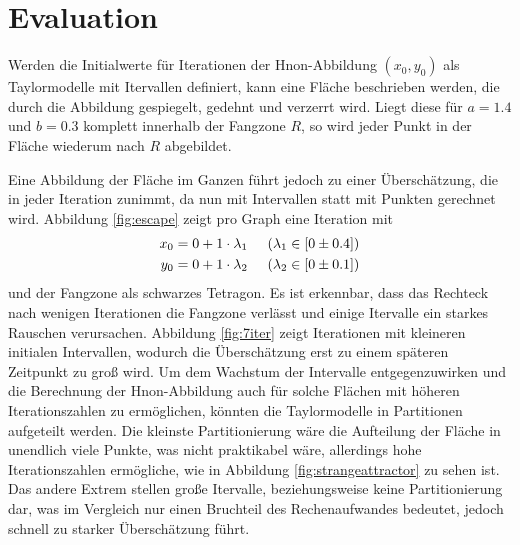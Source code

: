 
\chapter{Evaluation}
\label{ch:Evaluierung}

Werden die Initialwerte für Iterationen der H\e non-Abbildung $(x_0, y_0)$ als Taylormodelle mit Itervallen definiert, kann eine Fläche beschrieben werden, die durch die Abbildung gespiegelt, gedehnt und verzerrt wird. Liegt diese für $a=1.4$ und $b=0.3$ komplett innerhalb der Fangzone $R$, so wird jeder Punkt in der Fläche wiederum nach $R$ abgebildet. 


Eine Abbildung der Fläche im Ganzen führt jedoch zu einer Überschätzung, die in jeder Iteration zunimmt, da nun mit Intervallen statt mit Punkten gerechnet wird. Abbildung \ref{fig:escape} zeigt pro Graph eine Iteration mit 
\begin{align*}
x_0 = 0 + 1 \cdot \lambda_1 & \hspace{0.5cm} (\lambda_1 \in [0 \pm 0.4]) \\
 y_0 = 0 + 1 \cdot \lambda_2 & \hspace{0.5cm} (\lambda_2 \in [0 \pm 0.1])
\end{align*}
und der Fangzone als schwarzes Tetragon. Es ist erkennbar, dass das Rechteck nach wenigen Iterationen die Fangzone verlässt und einige Itervalle ein starkes Rauschen verursachen. Abbildung \ref{fig:7iter} zeigt  Iterationen mit kleineren initialen Intervallen, wodurch die Überschätzung erst zu einem späteren Zeitpunkt zu groß wird. Um dem Wachstum der Intervalle entgegenzuwirken und die Berechnung der H\e non-Abbildung auch für solche Flächen mit höheren Iterationszahlen zu ermöglichen, könnten die Taylormodelle in Partitionen aufgeteilt werden.  Die kleinste Partitionierung wäre die Aufteilung der Fläche in unendlich viele Punkte, was nicht praktikabel wäre, allerdings hohe Iterationszahlen ermögliche, wie in Abbildung \ref{fig:strangeattractor} zu sehen ist. Das andere Extrem stellen große Itervalle, beziehungsweise keine Partitionierung dar, was im Vergleich nur einen Bruchteil des Rechenaufwandes bedeutet, jedoch schnell zu starker Überschätzung führt.

